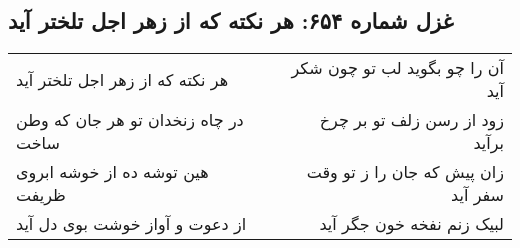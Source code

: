 \begin{center}
\section*{غزل شماره ۶۵۴: هر نکته که از زهر اجل تلختر آید}
\label{sec:0654}
\begin{longtable}{l p{0.5cm} r}
هر نکته که از زهر اجل تلختر آید
&&
آن را چو بگوید لب تو چون شکر آید
\\
در چاه زنخدان تو هر جان که وطن ساخت
&&
زود از رسن زلف تو بر چرخ برآید
\\
هین توشه ده از خوشه ابروی ظریفت
&&
زان پیش که جان را ز تو وقت سفر آید
\\
از دعوت و آواز خوشت بوی دل آید
&&
لبیک زنم نفخه خون جگر آید
\\
\end{longtable}
\end{center}

